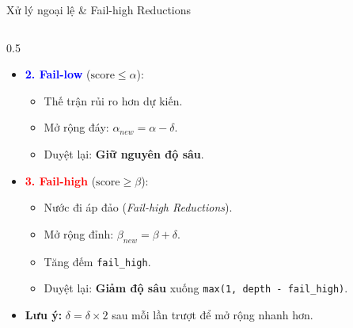 \begin{frame}{Xử lý ngoại lệ \& Fail-high Reductions}
    \begin{columns}[T]
        \begin{column}{0.5\textwidth}
            \begin{itemize}
                \item<1-> \textcolor{blue}{\textbf{2. Fail-low}} ($\text{score} \le \alpha$):
                \begin{itemize}
                    \item Thế trận rủi ro hơn dự kiến.
                    \item Mở rộng đáy: $\alpha_{new} = \alpha - \delta$.
                    \item Duyệt lại: \textbf{Giữ nguyên độ sâu}.
                \end{itemize}
                
                \vspace{0.4cm}
                \item<2-> \textcolor{red}{\textbf{3. Fail-high}} ($\text{score} \ge \beta$):
                \begin{itemize}
                    \item Nước đi áp đảo (\textit{Fail-high Reductions}).
                    \item Mở rộng đỉnh: $\beta_{new} = \beta + \delta$.
                    \item Tăng đếm \texttt{fail\_high}.
                    \item Duyệt lại: \textbf{Giảm độ sâu} xuống \texttt{max(1, depth - fail\_high)}.
                \end{itemize}
                \item<3-> \textbf{Lưu ý:} $\delta = \delta \times 2$ sau mỗi lần trượt để mở rộng nhanh hơn.
                  \vspace{0.6cm}
            \end{itemize}
        \end{column}
        

\end{columns}
\end{frame}
